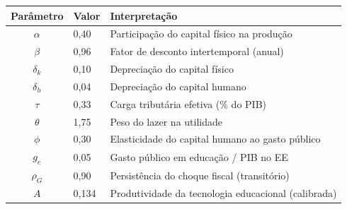 \begin{tabular}{cll}
\toprule
Parâmetro & Valor & Interpretação \\
\midrule
$\alpha$ & 0,40 & Participação do capital físico na produção \\
$\beta$ & 0,96 & Fator de desconto intertemporal (anual) \\
$\delta_k$ & 0,10 & Depreciação do capital físico \\
$\delta_h$ & 0,04 & Depreciação do capital humano \\
$\tau$ & 0,33 & Carga tributária efetiva (\% do PIB) \\
$\theta$ & 1,75 & Peso do lazer na utilidade \\
$\phi$ & 0,30 & Elasticidade do capital humano ao gasto público \\
$g_e$ & 0,05 & Gasto público em educação / PIB no EE \\
$\rho_G$ & 0,90 & Persistência do choque fiscal (transitório) \\
$A$ & 0,134 & Produtividade da tecnologia educacional (calibrada) \\
\bottomrule
\end{tabular}
